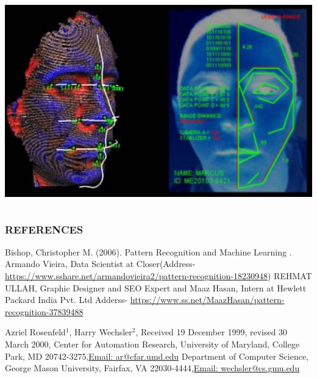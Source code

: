 \documentclass{beamer}
\begin{document}
\begin{frame}
\begin{itemize}
\begin{columns}
\begin{column}{.5\textwidth}
\includegraphics[width=.5\textwidth]{colorface.jpg}\pause
\end{column}
\end{columns}
\end{itemize}
\end{frame}


\begin{frame}
\transwipe

\frametitle{REFERENCES}\pause
\begin{thebibliography}{}
\bibitem{}  Bishop, Christopher M. (2006). Pattern Recognition and Machine Learning . \pause
 \bibitem{}   Armando Vieira, Data Scientist at Closer(Address- \href{URL}{ https://www.sshare.net/armandovieira2/pattern-recognition-18230948})\pause
\bibitem{} REHMAT ULLAH,  Graphic Designer and SEO Expert and Maaz Hasan, Intern at Hewlett Packard India Pvt. Ltd Adderss- \href{URL}{https://www.ss.net/MaazHasan/pattern-recognition-37839488}\pause

\bibitem{} Azriel Rosenfeld$^1$, Harry Wechsler$^2$, Received 19 December 1999, revised 30 March 2000, Center for Automation Research, University of Maryland, College Park, MD 20742-3275,\url{Email: ar@cfar.umd.edu} Department of Computer Science, George Mason University, Fairfax, VA 22030-4444,\url{Email: wechsler@cs.gmu.edu} \pause

\end{thebibliography}
\end{frame}
{
\begin{frame}
\end{frame}

}
\end{document}

